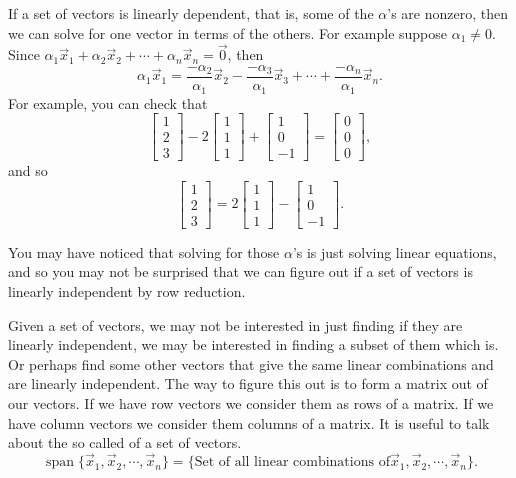 If a set of vectors is linearly dependent, that is, some of the $\alpha$'s
are nonzero, then we can solve for one vector in terms of the others.
For example suppose $\alpha_1 \not= 0$.  Since
$\alpha_1 \vec{x}_1 + 
\alpha_2 \vec{x}_2 + 
\cdots +
\alpha_n \vec{x}_n 
=
\vec{0}$, then
\begin{equation*}
\alpha_1 \vec{x}_1 
=
\frac{-\alpha_2}{\alpha_1}
\vec{x}_2 - 
\frac{-\alpha_3}{\alpha_1}
\vec{x}_3 + 
\cdots +
\frac{-\alpha_n}{\alpha_1}
\vec{x}_n .
\end{equation*}
For example, you can check that
\begin{equation*}
\begin{bmatrix} 1 \\ 2 \\ 3 \end{bmatrix}
-2
\begin{bmatrix} 1 \\ 1 \\ 1 \end{bmatrix}
+
\begin{bmatrix} 1 \\ 0 \\ -1 \end{bmatrix}
=
\begin{bmatrix} 0 \\ 0 \\ 0 \end{bmatrix} ,
\end{equation*}
and so
\begin{equation*}
\begin{bmatrix} 1 \\ 2 \\ 3 \end{bmatrix}
=
2
\begin{bmatrix} 1 \\ 1 \\ 1 \end{bmatrix}
-
\begin{bmatrix} 1 \\ 0 \\ -1 \end{bmatrix} .
\end{equation*}

You may have noticed that solving for those $\alpha$'s is just solving
linear equations, and so you may not be surprised that we can figure out
if a set of vectors is linearly independent by row reduction.

Given a set of vectors, we may not be interested in just finding if they
are linearly independent, we may be interested in finding a subset of
them which is.  Or perhaps find some other vectors that give the same linear
combinations and are linearly independent.
The way to figure this out is to form a matrix out of our vectors.  If we
have row vectors we consider them as rows of a matrix.  If we have
column vectors we consider them columns of a matrix.
It is useful to talk about the so called \emph{} of a
set of vectors.
\begin{equation*}
\operatorname{span} \{ \vec{x}_1, \vec{x}_2 , \cdots , \vec{x}_n \}
=
\{
\text{Set of all linear combinations of
$\vec{x}_1, \vec{x}_2 , \cdots , \vec{x}_n$}
\} .
\end{equation*}


